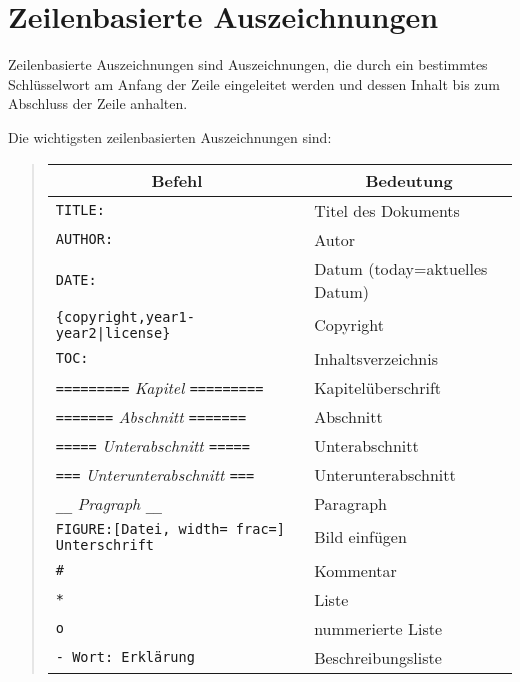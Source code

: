 \documentclass[%
oneside,                 %
final,                   %
chapterprefix=true,      %
open=right,              %
10pt]{book}
\begin{document}
\section{Zeilenbasierte Auszeichnungen}
Zeilenbasierte Auszeichnungen sind Auszeichnungen, die durch ein bestimmtes Schlüsselwort am Anfang der Zeile eingeleitet werden und dessen Inhalt bis zum Abschluss der Zeile anhalten.

Die wichtigsten zeilenbasierten Auszeichnungen sind:

\begin{quote}
\begin{tabular}{ll}
\hline
\multicolumn{1}{c}{ Befehl } & \multicolumn{1}{c}{ Bedeutung } \\
\hline
\texttt{TITLE:}                                    & Titel des Dokuments           \\
\texttt{AUTHOR:}                                   & Autor                         \\
\texttt{DATE:}                                     & Datum (today=aktuelles Datum) \\
\Verb!{copyright,year1-year2|license}!           & Copyright                     \\
\texttt{TOC:}                                      & Inhaltsverzeichnis            \\
\texttt{=========} \emph{Kapitel} \texttt{=========} & Kapitelüberschrift           \\
\texttt{=======} \emph{Abschnitt} \texttt{=======}   & Abschnitt                     \\
\texttt{=====} \emph{Unterabschnitt} \texttt{=====}  & Unterabschnitt                \\
\texttt{===} \emph{Unterunterabschnitt} \texttt{===} & Unterunterabschnitt           \\
\Verb!__! \emph{Pragraph} \Verb!__!              & Paragraph                     \\
\texttt{FIGURE:[Datei, width= frac=] Unterschrift} & Bild einfügen                \\
\Verb!#!                                         & Kommentar                     \\
\texttt{*}                                         & Liste                         \\
\texttt{o}                                         & nummerierte Liste             \\
\texttt{- Wort: Erklärung}                        & Beschreibungsliste            \\
\hline
\end{tabular}
\end{quote}
\end{document}
